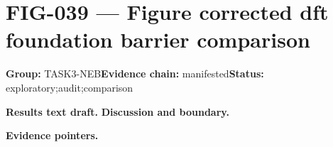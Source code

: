\clearpage
\section{FIG-039 --- Figure corrected dft foundation barrier comparison}
\label{figpage:fig-039}
\textbf{Group:} TASK3-NEB\quad \textbf{Evidence chain:} manifested\quad \textbf{Status:} exploratory;audit;comparison

\textbf{Results text draft.} 
\textbf{Discussion and boundary.} 


\textbf{Evidence pointers.}



\vfill
